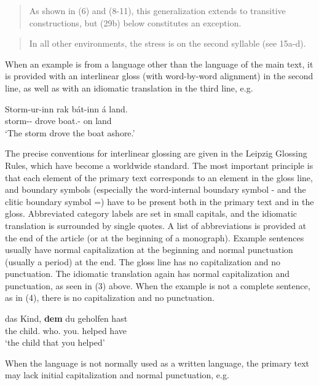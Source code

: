\documentclass[a4paper]{article}
\newenvironment{gsrexq}{\begin{quote}\color{blue}}{\end{quote}}
\newcommand{\eagsr}{\bgroup\color{blue}\ea}
\newcommand{\zgsr}{\z\egroup}
\begin{document}
\begin{gsrexq}
  As shown in (6) and (8-11), this generalization extends to transitive constructions, but (29b) below constitutes an exception.
\end{gsrexq}

\begin{gsrexq}
  In all other environments, the stress is on the second syllable (see 15a-d).
\end{gsrexq}

When an example is from a language other than the language of the main text, it
is provided with an interlinear gloss (with word-by-word alignment) in
the second line, as well as with an idiomatic translation in the third
line, e.g.

\eagsr
\gll Storm-ur-inn  rak   bát-inn      á land.\\
     storm-\NOM-\DEF{} drove boat.\ACC-\DEF{} on land\\
\glt     `The storm drove the boat ashore.'
\zgsr

The precise conventions for interlinear glossing are given in the
Leipzig Glossing Rules, which have become a worldwide standard. The most
important principle is that each element of the primary text corresponds
to an element in the gloss line, and boundary symbols (especially the
word-internal boundary symbol - and the clitic boundary symbol =) have
to be present both in the primary text and in the gloss. Abbreviated
category labels are set in small capitals, and the idiomatic translation
is surrounded by single quotes. A list of abbreviations is provided at
the end of the article (or at the beginning of a monograph). Example
sentences usually have normal capitalization at the beginning and normal
punctuation (usually a period) at the end. The gloss line has no
capitalization and no punctuation. The idiomatic translation again has
normal capitalization and punctuation, as seen in (3) above. When the
example is not a complete sentence, as in (4), there is no
capitalization and no punctuation.

\eagsr
\gll  das Kind, 	\textbf{dem} du 	     geholfen hast\\
      the child.\NOM{}  who.\DAT{}    you.\NOM{} helped   have\\
\glt  `the child that you helped' 
\zgsr

When the language is not normally used as a written language, the
primary text may lack initial capitalization and normal punctuation,
e.g.
\end{document}

